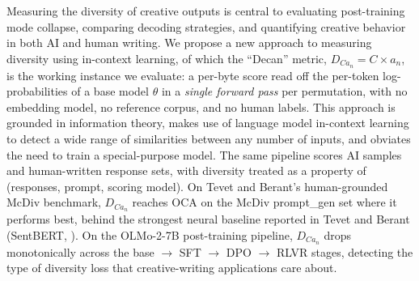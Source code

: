 Measuring the diversity of creative outputs is central to evaluating post-training mode collapse, comparing decoding strategies, and quantifying creative behavior in both AI and human writing.
We propose a new approach to measuring diversity using in-context learning, of which the ``Decan'' metric, $D_{Ca_n} = C \times a_n$, is the working instance we evaluate: a per-byte score read off the per-token log-probabilities of a base model $\theta$ in a \emph{single forward pass} per permutation, with no embedding model, no reference corpus, and no human labels.
This approach is grounded in information theory, makes use of language model in-context learning to detect a wide range of similarities between any number of inputs, and obviates the need to train a special-purpose model.
The same pipeline scores AI samples and human-written response sets, with diversity treated as a property of (responses, prompt, scoring model).
On Tevet and Berant's human-grounded McDiv benchmark, $D_{Ca_n}$ reaches OCA \tevetMcDivPromptGenCxAnOCA{} on the McDiv prompt\_gen set where it performs best, behind the strongest neural baseline reported in Tevet and Berant (SentBERT, \tevetMcDivPromptGenSentBertOCA{}).
On the OLMo-2-7B post-training pipeline, $D_{Ca_n}$ drops monotonically across the base $\to$ SFT $\to$ DPO $\to$ RLVR stages, detecting the type of diversity loss that creative-writing applications care about.
